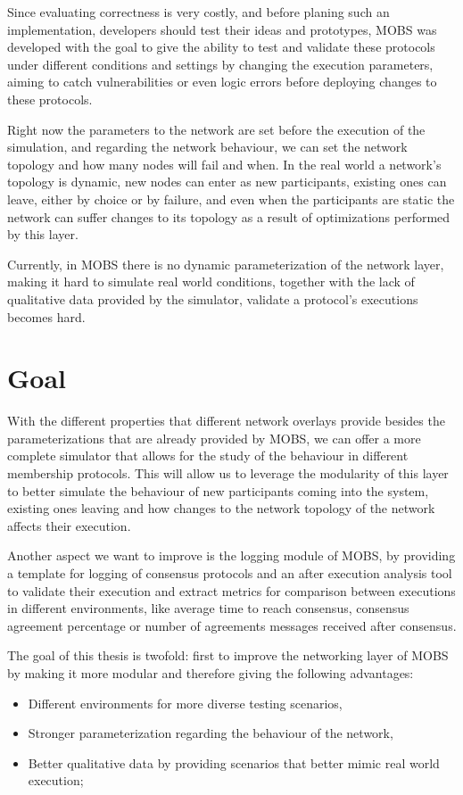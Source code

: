Since evaluating correctness is very costly, and before planing such an implementation, developers should test their ideas and prototypes,
MOBS was developed with the goal to give the ability to test and validate these protocols under different conditions and settings by 
changing the execution parameters, aiming to catch vulnerabilities or even logic errors before deploying changes to these protocols.

Right now the parameters to the network are set before the execution of the simulation, and regarding the network behaviour, we can
set the network topology and how many nodes will fail and when. In the real world a network's topology is dynamic, new nodes can enter
as new participants, existing ones can leave, either by choice or by failure, and even when the participants are static the network
can suffer changes to its topology as a result of optimizations performed by this layer.

Currently, in MOBS there is no dynamic parameterization of the network layer, making it hard to simulate real world conditions,
together with the lack of qualitative data provided by the simulator, validate a protocol's executions becomes hard.


\section{Goal}\label{sub:goal}

With the different properties that different network overlays provide besides the parameterizations that are already provided by MOBS,
we can offer a more complete simulator that allows for the study of the behaviour in different membership protocols.
This will allow us to leverage the modularity of this layer to better simulate the behaviour of new participants coming into the system, existing
ones leaving and how changes to the network topology of the network affects their execution.

Another aspect we want to improve is the logging module of MOBS, by providing a template for logging of consensus protocols and
an after execution analysis tool to validate their execution and extract metrics for
comparison between executions in different environments, like average time to reach consensus, consensus agreement percentage or
number of agreements messages received after consensus.


The goal of this thesis is twofold: first to improve the networking layer of MOBS by making it more modular and therefore giving the following advantages:
\begin{itemize}
  \item Different environments for more diverse testing scenarios,
  \item Stronger parameterization regarding the behaviour of the network,
  \item Better qualitative data by providing scenarios that better mimic real world execution;
\end{itemize}

